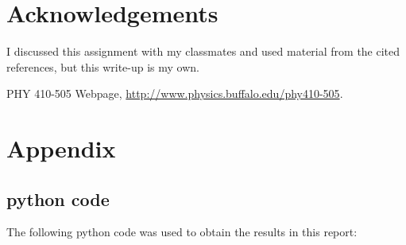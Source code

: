 \documentclass[11pt,letterpaper]{article}
\begin{document}
\newpage
\section*{Acknowledgements}

I discussed this assignment with my classmates and used material from the
cited references, but this write-up is my own.

\begin{thebibliography}{9}


PHY 410-505 Webpage, \url{http://www.physics.buffalo.edu/phy410-505}.



\end{thebibliography}

\newpage
\appendix
\section{Appendix}

\subsection{python code}

The following python code was used to obtain the results in this report:






\end{document}
